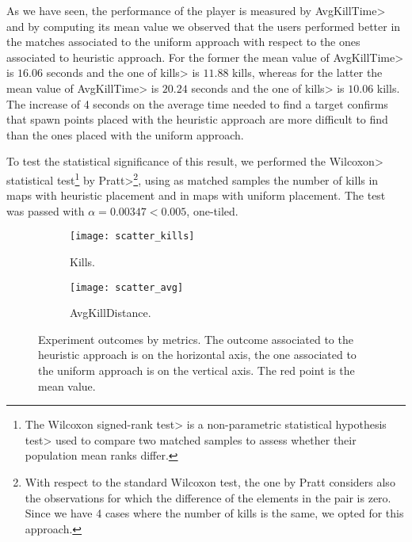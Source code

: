 \par

As we have seen, the performance of the player is measured by \<AvgKillTime> and by computing its mean value we observed that the users performed better in the matches associated to the uniform approach with respect to the ones associated to heuristic approach. For the former the mean value of \<AvgKillTime> is $16.06$ seconds and the one of \<kills> is $11.88$ kills, whereas for the latter the mean value of \<AvgKillTime> is $20.24$ seconds and the one of \<kills> is $10.06$ kills. The increase of 4 seconds on the average time needed to find a target confirms that spawn points placed with the heuristic approach are more difficult to find than the ones placed with the uniform approach.

\par

To test the statistical significance of this result, we performed the \<Wilcoxon> statistical test\footnote{The \<Wilcoxon signed-rank test> is a \<non-parametric statistical hypothesis test> used to compare two matched samples to assess whether their population mean ranks differ.} by \<Pratt>\footnote{With respect to the standard Wilcoxon test, the one by Pratt considers also the observations for which the difference of the elements in the pair is zero. Since we have 4 cases where the number of kills is the same, we opted for this approach.}, using as matched samples the number of kills in maps with heuristic placement and in maps with uniform placement. The test was passed with $\alpha = 0.00347 < 0.005$, one-tiled.

\begin{figure}[h]
\centering
\begin{subfigure}[t]{0.48\linewidth}
\texttt{[image: scatter\_kills]}
\caption{Kills.}
\label{img:scatter_kills}
\end{subfigure}
\hfill
\begin{subfigure}[t]{0.48\linewidth}
\texttt{[image: scatter\_avg]}
\caption{AvgKillDistance.}
\label{img:scatter_avg}
\end{subfigure}
\caption[Experiment outcomes by metrics.]{Experiment outcomes by metrics. The outcome associated to the heuristic approach is on the horizontal axis, the one associated to the uniform approach is on the vertical axis. The red point is the mean value.}
\label{img:metrics} 
\end{figure}

